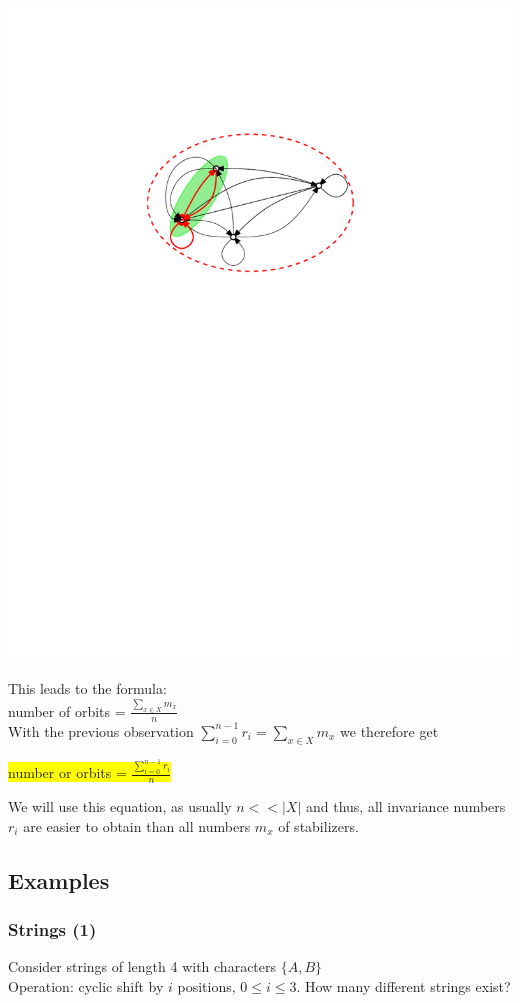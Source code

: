 \documentclass[12pt,onecolumn%
]{scrartcl}
\begin{document}
{\includegraphics[scale=0.6, trim=165 460 125 150, clip]{img/orbit_right}

This leads to the formula: \\
number of orbits = $\frac{\sum \limits_{x \in X} m_{x}}{n}$ \\
With the previous observation $\sum \limits_{i = 0}^{n - 1} r_{i} = \sum \limits_{x \in X} m_{x}$
we therefore get
\begin{center}
\colorbox{yellow}{number or orbits = $\frac{\sum \limits_{i = 0}^{n - 1} r_{i}}{n}$}
\end{center}
We will use this equation, as usually $n << |X|$ and thus,
all invariance numbers $r_{i}$ are easier to obtain than all
numbers $m_{x}$ of stabilizers.

\subsection{Examples}
\subsubsection{Strings (1)}
Consider strings of length 4 with characters $\{A,B\}$\\
Operation: cyclic shift by $i$ positions, $0 \leq i \leq 3$. How many
different strings exist?

}
\end{document}
